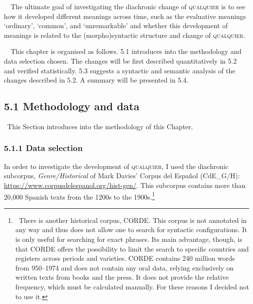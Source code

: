 \begin{styleStandard}
\ \ The ultimate goal of investigating the diachronic change of \textsc{qualquier} is to see how it developed different meanings across time, such as the evaluative meanings ‘ordinary’, ‘common’, and ‘unremarkable’ and whether this development of meanings is related to the (morpho)syntactic structure and change of \textsc{qualquier.} 
\end{styleStandard}

\begin{styleStandard}
\ \ This chapter is organised as follows. 5.1 introduces into the methodology and data selection chosen. The changes will be first described quantitatively in 5.2 and verified statistically. 5.3 suggests a syntactic and semantic analysis of the changes described in 5.2. A summary will be presented in 5.4.
\end{styleStandard}

\subsection[5.1 Methodology and data]{\textbf{5.1 Methodology and data}}
\begin{styleStandard}
\ This Section introduces into the methodology of this Chapter. 
\end{styleStandard}

\subsubsection[5.1.1 Data selection]{\textbf{5.1.1 Data selection}}
\begin{styleStandard}
In order to investigate the development of \textsc{qualquier}, I used the diachronic subcorpus, \textit{Genre/Historical} of Mark Davies’ Corpus del Español (CdE\_G/H): \url{https://www.corpusdelespanol.org/hist-gen/}. This subcorpus contains more than 20,000 Spanish texts from the 1200s to the 1900s.\footnote{\textrm{\ There is another historical corpus, CORDE. This corpus is not annotated in any way and thus does not allow one to search for syntactic configurations. It is only useful for searching for exact phrases. Its main advantage, though, is that CORDE offers the possibility to limit the search to specific countries and registers across periods and varieties. CORDE contains 240 million words from 950–1974 and does not contain any oral data, relying exclusively on written texts from books and the press. It does not provide the relative frequency, which must be calculated manually. For these reasons I decided not to use it.}}
\end{styleStandard}

